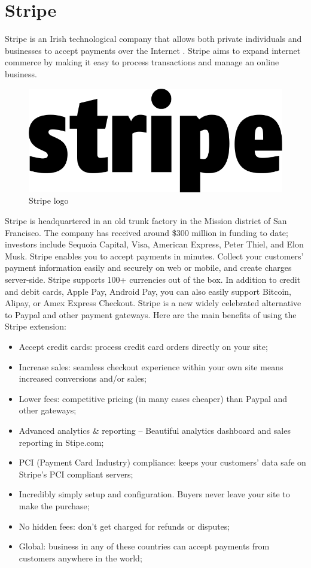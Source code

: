 \section{Stripe}
\label{sec:stripe}
Stripe is an Irish technological company that allows both private individuals and businesses to accept payments over the Internet \cite{stripe_doc_a}.
Stripe aims to expand internet commerce by making it easy to process transactions and manage an online business.
\begin{figure}[htb]
\centering
\includegraphics[width=0.3\linewidth]{images/chapter2/stripe-logo.png}\hfill
\caption[Stripe logo]{Stripe logo}
\label{fig:stripe_logo}
\end{figure}
Stripe is headquartered in an old trunk factory in the Mission district of San Francisco. The company has received around \$300 million in funding to date; investors include Sequoia Capital, Visa, American Express, Peter Thiel, and Elon Musk. Stripe enables you to accept payments in minutes. Collect your customers’ payment information easily and securely on web or mobile, and create charges server-side. Stripe supports 100+ currencies out of the box. In addition to credit and debit cards, Apple Pay, Android Pay, you can also easily support Bitcoin, Alipay, or Amex Express Checkout.
\newline
Stripe is a new widely celebrated alternative to Paypal and other payment gateways. Here are the main benefits of using the Stripe extension:
\begin{itemize}
\item Accept credit cards: process credit card orders directly on your site;
\item Increase sales: seamless checkout experience within your own site means increased conversions and/or sales;
\item Lower fees: competitive pricing (in many cases cheaper) than Paypal and other gateways;
\item Advanced analytics \& reporting – Beautiful analytics dashboard and sales reporting in Stipe.com;
\item PCI (Payment Card Industry) compliance: keeps your customers’ data safe on Stripe’s PCI compliant servers;
\item Incredibly simply setup and configuration. Buyers never leave your site to make the purchase;
\item No hidden fees: don’t get charged for refunds or disputes;
\item Global: business in any of these countries can accept payments from customers anywhere in the world;
\end{itemize}

